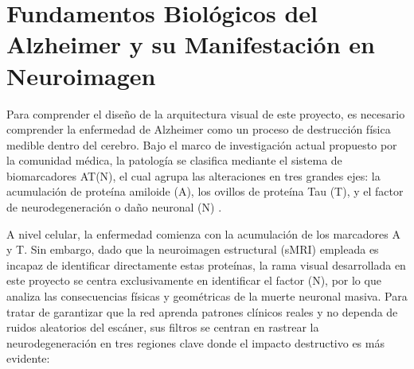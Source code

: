 \documentclass[12pt, oneside, english, spanish]{book}
\begin{document}
\section{Fundamentos Biológicos del Alzheimer y su Manifestación en Neuroimagen} \label{sec:bases_biologicas_alzheimer}

Para comprender el diseño de la arquitectura visual de este proyecto, es necesario comprender la enfermedad de Alzheimer como un proceso de destrucción física medible dentro del cerebro. Bajo el marco de investigación actual propuesto por la comunidad médica, la patología se clasifica mediante el sistema de biomarcadores AT(N), el cual agrupa las alteraciones en tres grandes ejes: la acumulación de proteína amiloide (A), los ovillos de proteína Tau (T), y el factor de neurodegeneración o daño neuronal (N) \cite{jack2018nia}. 

A nivel celular, la enfermedad comienza con la acumulación de los marcadores A y T. Sin embargo, dado que la neuroimagen estructural (sMRI) empleada es incapaz de identificar directamente estas proteínas, la rama visual desarrollada en este proyecto se centra exclusivamente en identificar el factor (N), por lo que analiza las consecuencias físicas y geométricas de la muerte neuronal masiva. Para tratar de garantizar que la red aprenda patrones clínicos reales y no dependa de ruidos aleatorios del escáner, sus filtros se centran en rastrear la neurodegeneración en tres regiones clave donde el impacto destructivo es más evidente:
\end{document}
